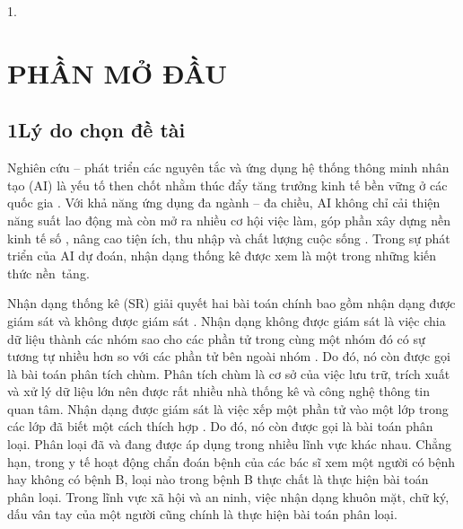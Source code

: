 \documentclass[a4paper,oneside]{book} %
\theoremstyle{plain}
\theoremstyle{plain}
\theoremstyle{nonumberplain}
\begin{document}
{\begin{spacing}{1.}
\end{spacing}
}

	\clearpage

\chapter*{PHẦN MỞ ĐẦU}\label{chapter_intro}
%



\section*{1\quad Lý do chọn đề tài}

 Nghiên cứu -- phát triển các nguyên tắc và ứng dụng hệ thống thông minh nhân tạo (AI) là yếu tố then chốt nhằm thúc đẩy tăng trưởng kinh tế bền vững ở các quốc gia \cite{belhadi2024artificial,act2023artificial}. Với khả năng ứng dụng đa ngành -- đa chiều, AI không chỉ cải thiện năng suất lao động mà còn mở ra nhiều cơ hội việc làm, góp phần xây dựng nền kinh tế số \cite{mollema2024ai}, nâng cao tiện ích, thu nhập và chất lượng cuộc sống \cite{dey2024artificial}. Trong sự phát triển của AI dự đoán, nhận dạng thống kê được xem là một trong những kiến thức nền~tảng.


Nhận dạng thống kê (SR) giải quyết hai bài toán chính bao gồm nhận dạng được giám sát và không được giám sát \cite{Bishop:DeepLearning24,theodoridis2006pattern}. Nhận dạng không được giám sát  là việc chia dữ liệu thành các nhóm sao cho các phần tử trong cùng một nhóm đó có sự tương tự nhiều hơn so với các phần tử bên ngoài nhóm \cite{bezdek1984fcm,macqueen1967some}. Do đó, nó còn được gọi là bài toán phân tích chùm. Phân tích chùm là cơ sở của việc lưu trữ, trích xuất và xử lý dữ liệu lớn nên được rất nhiều nhà thống kê và công nghệ thông tin quan tâm.  Nhận dạng được giám sát là việc xếp một phần tử vào một lớp trong các lớp đã biết một cách thích hợp \cite{Bishop:DeepLearning24,webb2003statistical}. Do đó, nó còn được gọi là bài toán phân loại. Phân loại đã và đang được áp dụng trong nhiều lĩnh vực khác nhau. Chẳng hạn, trong y tế hoạt động chẩn đoán bệnh của các bác sĩ xem một người có bệnh hay không có bệnh B, loại nào trong bệnh B thực chất là thực hiện bài toán phân loại. Trong lĩnh vực xã hội và an ninh, việc nhận dạng khuôn mặt, chữ ký, dấu vân tay của một người cũng chính là thực hiện bài toán phân loại.
\end{document}
